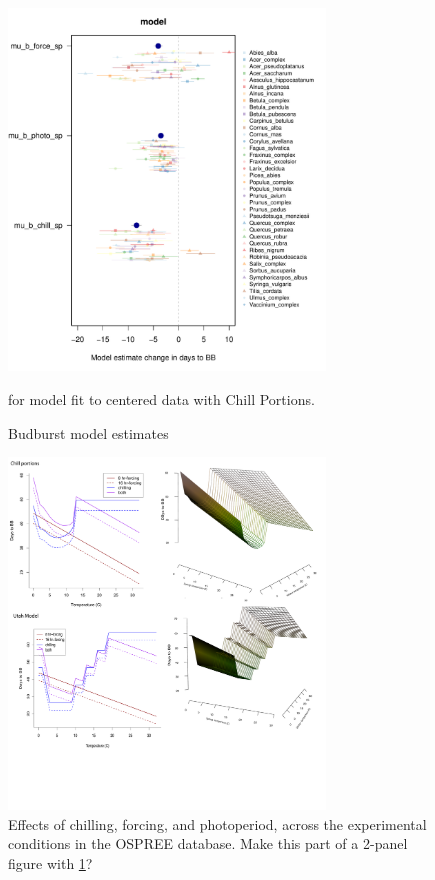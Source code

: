 \documentclass{article}
\begin{document}
\begin{figure}[h!]
\centering
\noindent \includegraphics[width=0.75\textwidth]{..//..//analyses/bb_analysis/figures/muplotmodelspcomwcrops_expramp_fpz.pdf}
\caption{Budburst model estimates} for model fit to centered data with Chill Portions. 
\label{fig:mu}
\end{figure}

\newpage
\begin{figure}[h!]
\centering
\noindent \includegraphics[width=0.75\textwidth]{..//..//analyses/bb_analysis/figures/bbmod_3dplot_4panels.pdf}
\caption{Effects of chilling, forcing, and photoperiod, across the experimental conditions in the OSPREE database. Make this part of a 2-panel figure with \ref{fig:mu}?}
\label{fig:apc}
\end{figure}
\end{document}
